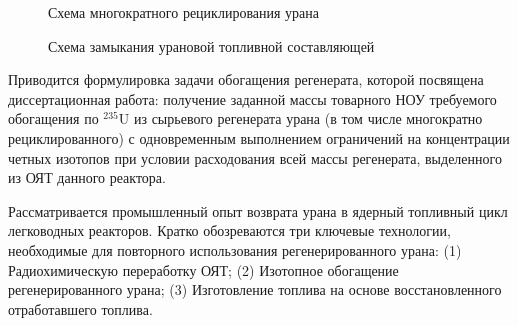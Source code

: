 \begin{figure}[ht]
  \caption{Схема многократного рециклирования урана}\label{fig_autoref1}
\end{figure}

\begin{figure}[ht]
  \caption{Схема замыкания урановой топливной составляющей}\label{fig_autoref2}
\end{figure}

Приводится формулировка задачи обогащения регенерата, которой посвящена диссертационная работа: получение заданной массы товарного НОУ требуемого обогащения по $^{235}$U из сырьевого регенерата урана (в том числе многократно рециклированного) с одновременным выполнением ограничений на концентрации четных изотопов при условии расходования всей массы реге­нерата, выделенного из ОЯТ данного реактора.

Рассматривается промышленный опыт возврата урана в ядерный топливный цикл легководных реакторов. Кратко обозреваются три ключевые технологии, необходимые для повторного использования регенерированного урана:
(1) Радиохимическую переработку ОЯТ; (2) Изотопное обогащение регенерированного урана; (3) Изготовление топлива на основе восстановленного отработавшего топлива.

